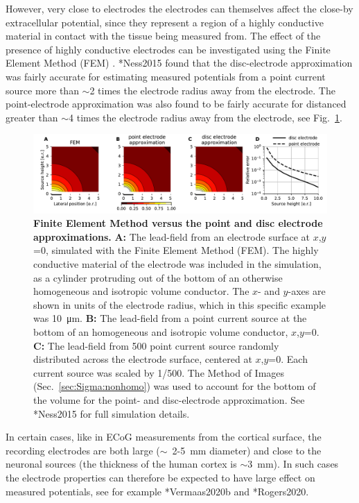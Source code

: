 However, very close to electrodes the electrodes can themselves affect the close-by extracellular potential, since they represent a region of a highly conductive material in contact with the tissue being measured from.
The effect of the presence of highly conductive electrodes can be investigated using the Finite Element Method (FEM) . \citeasnoun**{Ness2015} found that the disc-electrode approximation was fairly accurate for estimating measured potentials from a point current source more than $\sim$2 times the electrode radius away from the electrode. The point-electrode approximation was also found to be fairly accurate for distanced greater than $\sim$4 times the electrode radius away from the electrode, see Fig.~\ref{VC:fig:FEM_elec}.

\begin{figure}[!ht]
\begin{center}
\includegraphics[width=1\textwidth]{Figures/VC/fig_FEM_elec.pdf}
\end{center}
\caption[]{\textbf{Finite Element Method versus the point and disc electrode approximations.}
{\bf A:} The lead-field from an electrode surface at $x$,$y$=0, simulated with the Finite Element Method (FEM). The highly conductive material of the electrode was included in the simulation, as a cylinder protruding out of the bottom of an otherwise homogeneous and isotropic volume conductor. The $x$- and $y$-axes are shown in units of the electrode radius, which in this specific example was 10~\si{\micro\metre}.
{\bf B:} The lead-field from a point current source at the bottom of an homogeneous and isotropic volume conductor, $x$,$y$=0.
{\bf C:} The lead-field from 500 point current source randomly distributed across the electrode surface, centered at $x$,$y$=0. Each current source was scaled by 1/500.
The Method of Images (Sec.~\ref{sec:Sigma:nonhomo}) was used to account for the bottom of the volume for the point- and disc-electrode approximation.
See \citeasnoun**{Ness2015} for full simulation details.
}
\label{VC:fig:FEM_elec}
\end{figure}

In certain cases, like in ECoG  measurements from the cortical surface, the recording electrodes are both large ($\sim$~2-5~mm diameter) and close to the neuronal sources (the thickness of the human cortex is $\sim$3~mm). In such cases the electrode properties can therefore be expected to have large effect on measured potentials, see for example \citeasnoun**{Vermaas2020b} and \citeasnoun**{Rogers2020}.

